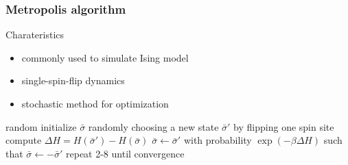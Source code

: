 \documentclass[notheorems]{beamer}
\begin{document}
\begin{frame}
\frametitle{Metropolis algorithm}
\begin{block}{Charateristics}
\begin{itemize}
	\item commonly used to simulate Ising model
	\item single-spin-flip dynamics 
	\item stochastic method for optimization
\end{itemize}
\end{block}
	\begin{algorithmic}[1]
	\STATE random initialize $\bar{\sigma}$
	\STATE randomly choosing a new state $\bar{\sigma}'$ by flipping one spin site
	\STATE compute $\Delta H= H(\bar{\sigma}') - H(\bar{\sigma})$
	\STATE $\bar{\sigma} \leftarrow \bar{\sigma}'$
	\ELSE
	\STATE with probability $\exp(-\beta \Delta H)$ 
	such that $\bar{\sigma} \leftarrow -\bar{\sigma}'$ 
	\ENDIF
	\STATE repeat 2-8 until convergence
\end{algorithmic}
\end{frame}
\end{document}

